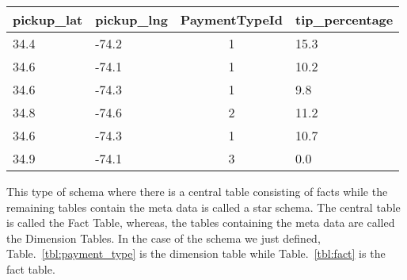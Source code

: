 
\begin{center}
  \begin{tabular}{ | l | l | c | l | }
    \hline
    \textbf{pickup\_lat} & \textbf{pickup\_lng} & \textbf{PaymentTypeId} & \textbf{tip\_percentage} \\ \hline
    34.4 & -74.2 & 1 & 15.3 \\ \hline
    34.6 & -74.1 & 1 & 10.2 \\ \hline
    34.6 & -74.3 & 1 & 9.8 \\ \hline
    34.8 & -74.6 & 2 & 11.2 \\ \hline
    34.6 & -74.3 & 1 & 10.7 \\ \hline
    34.9 & -74.1 & 3 & 0.0 \\
    \hline
  \end{tabular}
\end{center}
\label{tbl:fact}

This type of schema where there is a central table consisting of facts while the remaining tables contain the meta data is called a star schema. The central table is called the Fact Table, whereas, the tables containing the meta data are called the Dimension Tables. In the case of the schema we just defined, Table.~\ref{tbl:payment_type} is the dimension table while Table.~\ref{tbl:fact} is the fact table.

